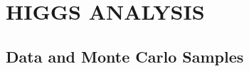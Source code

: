 %
%
%



\chapter{\uppercase {Higgs Analysis}}
\label{ch:analysis}

\section{Data and Monte Carlo Samples}


